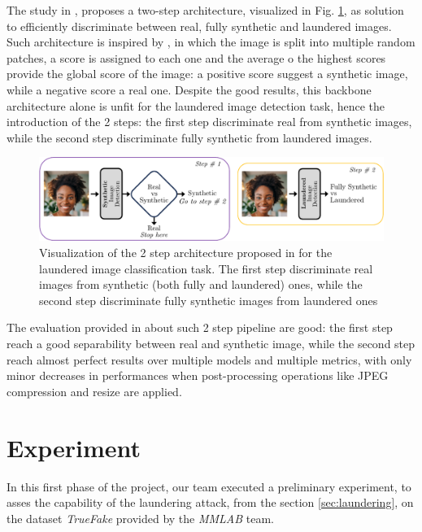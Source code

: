 \documentclass[conference]{IEEEtran} %
\begin{document}
        The study in \cite{mandelli2024synthetic}, proposes a two-step architecture, visualized in Fig. \ref{fig:launder_2_stage}, as solution to efficiently discriminate between real, fully synthetic and laundered images. Such architecture is inspired by \cite{mandelli2022detecting}, in which the image is split into multiple random patches, a score is assigned to each one and the average o the highest scores provide the global score of the image: a positive score suggest a synthetic image, while a negative score a real one. Despite the good results, this backbone architecture alone is unfit for the laundered image detection task, hence the introduction of the 2 steps: the first step discriminate real from synthetic images, while the second step discriminate fully synthetic from laundered images.

        \begin{figure}[h]
            \centering
            \includegraphics[width=0.95\linewidth]{Img/launder_2_stage.png}
            \caption{Visualization of the 2 step architecture proposed in \cite{mandelli2024synthetic} for the laundered image classification task. The first step discriminate real images from synthetic (both fully and laundered) ones, while the second step discriminate fully synthetic images from laundered ones}
            \label{fig:launder_2_stage}
        \end{figure}

        The evaluation provided in \cite{mandelli2022detecting} about such 2 step pipeline are good: the first step reach a good separability between real and synthetic image, while the second step reach almost perfect results over multiple models and multiple metrics, with only minor decreases in performances when post-processing operations like JPEG compression and resize are applied.

\section{Experiment}
    In this first phase of the project, our team executed a preliminary experiment, to asses the capability of the laundering attack, from the section \ref{sec:laundering}, on the dataset \textit{TrueFake} provided by the \textit{MMLAB} team.
\end{document}

